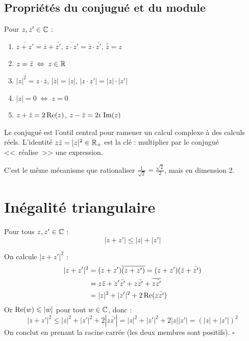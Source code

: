 \subsection{Propriétés du conjugué et du module}

\begin{propbox}
Pour $z, z' \in \mathbb{C}$ :
\begin{enumerate}[leftmargin=1.5cm]
  \item $\overline{z + z'} = \bar{z} + \bar{z'}$, \quad $\overline{z \cdot z'} = \bar{z} \cdot \bar{z'}$, \quad $\bar{\bar{z}} = z$
  \item $z = \bar{z} \;\Leftrightarrow\; z \in \mathbb{R}$
  \item $|z|^2 = z \cdot \bar{z}$, \quad $|\bar{z}| = |z|$, \quad $|z \cdot z'| = |z| \cdot |z'|$
  \item $|z| = 0 \;\Leftrightarrow\; z = 0$
  \item $z + \bar{z} = 2\operatorname{Re}(z)$, \quad $z - \bar{z} = 2i\,\operatorname{Im}(z)$
\end{enumerate}
\end{propbox}

\begin{intuitionbox}
Le conjugué est l'outil central pour ramener un calcul complexe à des calculs réels. L'identité $z\bar{z} = |z|^2 \in \mathbb{R}_+$ est la clé : multiplier par le conjugué <<~réalise~>> une expression.

C'est le même mécanisme que rationaliser $\frac{1}{\sqrt{2}} = \frac{\sqrt{2}}{2}$, mais en dimension 2.
\end{intuitionbox}


\section{Inégalité triangulaire}

\begin{thmbox}
Pour tous $z, z' \in \mathbb{C}$ :
\[
  |z + z'| \leqslant |z| + |z'|
\]
\end{thmbox}

\begin{proofbox}
On calcule $|z + z'|^2$ :
\begin{align*}
  |z + z'|^2 &= (z + z')\overline{(z + z')} = (z + z')(\bar{z} + \bar{z'}) \\
  &= z\bar{z} + z'\bar{z'} + z\bar{z'} + \overline{z\bar{z'}} \\
  &= |z|^2 + |z'|^2 + 2\operatorname{Re}(z\bar{z'})
\end{align*}
Or $\operatorname{Re}(w) \leqslant |w|$ pour tout $w \in \mathbb{C}$, donc :
\[
  |z + z'|^2 \leqslant |z|^2 + |z'|^2 + 2|z\bar{z'}| = |z|^2 + |z'|^2 + 2|z||z'| = (|z| + |z'|)^2
\]
On conclut en prenant la racine carrée (les deux membres sont positifs). \hfill$\square$
\end{proofbox}

